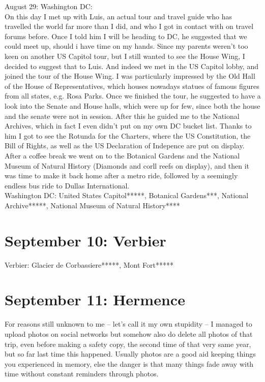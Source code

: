 August 29: Washington DC:\\
On this day I met up with Luis, an actual tour and travel guide who has travelled the world far more than I did, and who I got in contact with on travel forums before. Once I told him I will be heading to DC, he suggested that we could meet up, should i have time on my hands. Since my parents weren't too keen on another US Capitol tour, but I still wanted to see the House Wing, I decided to suggest that to Luis. And indeed we met in the US Capitol lobby, and joined the tour of the House Wing. I was particularly impressed by the Old Hall of the House of Representatives, which houses nowadays statues of famous figures from all states, e.g. Rosa Parks. Once we finished the tour, he suggested to have a look into the Senate and House halls, which were up for few, since both the house and the senate were not in session. After this he guided me to the National Archives, which in fact I even didn't put on my own DC bucket list. Thanks to him I got to see the Rotunda for the Charters, where the US Constitution, the Bill of Rights, as well as the US Declaration of Indepence are put on display. After a coffee break we went on to the Botanical Gardens and the National Museum of Natural History (Diamonds and corll reefs on display), and then it was time to make it back home after a metro ride, followed by a seemingly endless bus ride to Dullas International.\\

Washington DC: United States Capitol*****, Botanical Gardens***, National Archive*****, National Museum of Natural History****

\section{September 10: Verbier}
\label{Verbier2018}

Verbier: Glacier de Corbassiere*****, Mont Fort*****

\section{September 11: Hermence}
\label{GrandeDixence2016}

For reasons still unknown to me -- let's call it my own stupidity -- I managed to upload photos on social networks but somehow also do delete all photos of that trip, even before making a safety copy, the second time of that very same year, but so far last time this happened. Usually photos are a good aid keeping things you experienced in memory, else the danger is that many things fade away with time without constant reminders through photos.\\

